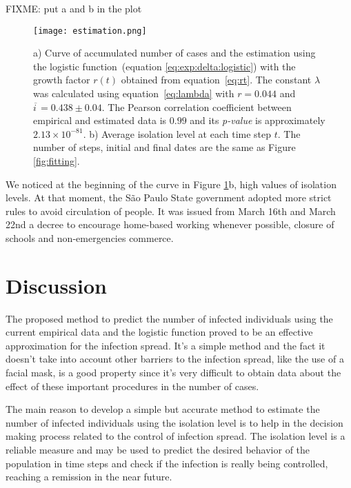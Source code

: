 \documentclass[review]{elsarticle}
\begin{document}
FIXME: put a and b in the plot
\begin{figure}
\centering
\texttt{[image: estimation.png]}
\caption{a) Curve of accumulated number of cases 
and the estimation using the logistic 
function~(equation \ref{eq:exp:delta:logistic}) 
with the growth factor $r(t)$ obtained from equation~\ref{eq:rt}. 
The constant $\lambda$ was calculated using equation~\ref{eq:lambda} with 
$r=0.044$ and \hbox{$\overline{i\,} = 0.438\pm 0.04$}. 
The Pearson correlation coefficient between empirical and estimated data is $0.99$ 
and its {\it p-value\/} is approximately \hbox{$2.13\times 10^{-81}$}. 
b) Average isolation level at each time step $t$. 
The number of steps, initial and final dates are 
the same as Figure \ref{fig:fitting}.}
\label{fig:estimation}
\end{figure}

We noticed at the beginning of the curve in Figure \ref{fig:estimation}b, high values of isolation levels. 
At that moment, the São Paulo State government adopted more strict rules to avoid circulation of people. 
It was issued from March 16th and March 22nd a decree to encourage home-based working whenever possible, 
closure of schools and non-emergencies commerce\cite{Cruz2020}.

\section{Discussion}

The proposed method to predict the number of infected individuals 
using the current empirical data and the logistic function proved 
to be an effective approximation for the infection spread. 
It’s a simple method and the fact it doesn’t take into account 
other barriers to the infection spread, like the use of a facial mask, 
is a good property since it’s very difficult to obtain data about 
the effect of these important procedures in the number of cases.

The main reason to develop a simple but accurate method to estimate 
the number of infected individuals using the isolation level is to help 
in the decision making process related to the control of infection spread. 
The isolation level is a reliable measure and may be used to predict 
the desired behavior of the population in time steps and check if the infection 
is really being controlled, reaching a remission in the near future.
\end{document}
